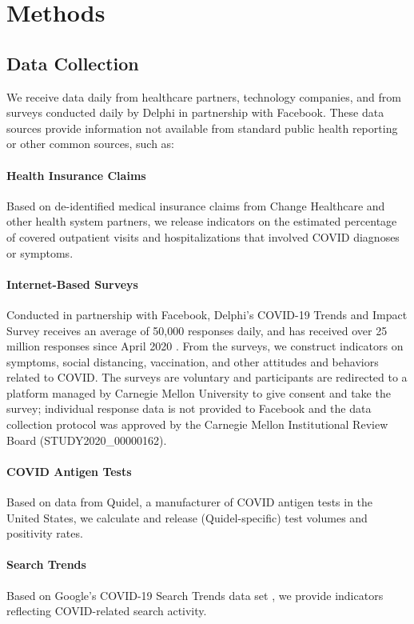 \documentclass[11pt]{article}
\begin{document}
\section{Methods}

\subsection{Data Collection}

We receive data daily from healthcare partners, technology companies, and from
surveys conducted daily by Delphi in partnership with Facebook. These data
sources provide information not available from standard public health reporting
or other common sources, such as:

\paragraph{Health Insurance Claims} Based on de-identified medical insurance
claims from Change Healthcare and other health system partners, we release
indicators on the estimated percentage of covered outpatient visits and
hospitalizations that involved COVID diagnoses or symptoms.

\paragraph{Internet-Based Surveys} Conducted in partnership with Facebook,
Delphi's COVID-19 Trends and Impact Survey receives an average of 50,000
responses daily, and has received over 25 million responses since April 2020
\cite{Salomon:2021, Kreuter:2020}. From the surveys, we construct indicators on
symptoms, social distancing, vaccination, and other attitudes and behaviors
related to COVID. The surveys are voluntary and participants are redirected to a
platform managed by Carnegie Mellon University to give consent and take the
survey; individual response data is not provided to Facebook and the data
collection protocol was approved by the Carnegie Mellon Institutional Review
Board (STUDY2020\_00000162).

\paragraph{COVID Antigen Tests} Based on data from Quidel, a manufacturer of
COVID antigen tests in the United States, we calculate and release
(Quidel-specific) test volumes and positivity rates.

\paragraph{Search Trends} Based on Google's COVID-19 Search Trends data set
\cite{GoogleSymptoms}, we provide indicators reflecting COVID-related search
activity.
\end{document}
